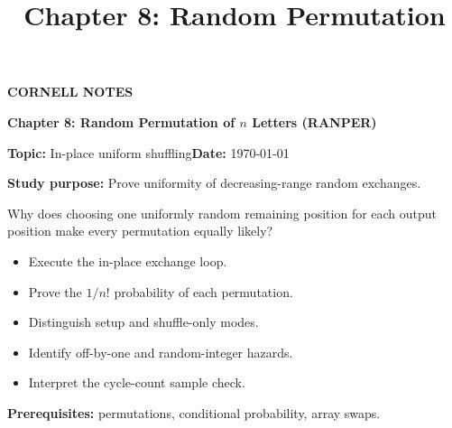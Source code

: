 \documentclass[10pt,letterpaper]{article}
\title{Chapter 8: Random Permutation}
\author{}
\date{}
\begin{document}
\maketitle
\begin{tcolorbox}[colback=Paper,colframe=Ink]{\small\bfseries\color{Teal}CORNELL NOTES}\par{\LARGE\bfseries Chapter 8: Random Permutation of $n$ Letters (RANPER)}\par\medskip\textbf{Topic:} In-place uniform shuffling\hfill\textbf{Date:} \today\par\textbf{Study purpose:} Prove uniformity of decreasing-range random exchanges.\end{tcolorbox}
\begin{tcolorbox}[colback=Teal!5,colframe=Teal,title=Essential question]Why does choosing one uniformly random remaining position for each output position make every permutation equally likely?\end{tcolorbox}
\begin{tcolorbox}[colback=white,colframe=Mist,title=Learning objectives]\begin{itemize}\item Execute the in-place exchange loop.\item Prove the $1/n!$ probability of each permutation.\item Distinguish setup and shuffle-only modes.\item Identify off-by-one and random-integer hazards.\item Interpret the cycle-count sample check.\end{itemize}\textbf{Prerequisites:} permutations, conditional probability, array swaps.\end{tcolorbox}
\end{document}
